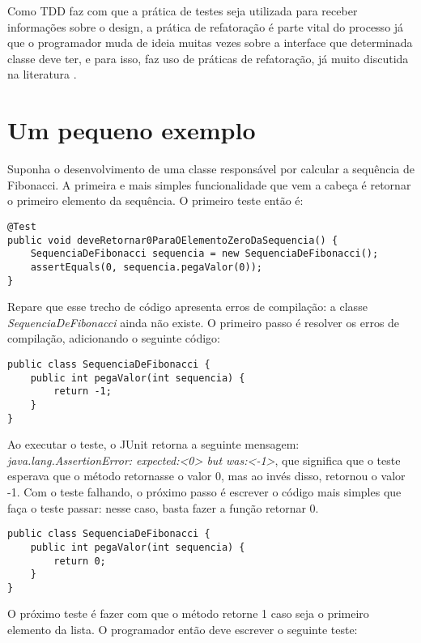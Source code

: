 Como TDD faz com que a prática de testes seja utilizada para receber informações sobre o design, 
a prática de refatoração é parte vital do processo já que o programador muda de ideia muitas vezes sobre a interface que determinada
classe deve ter, e para isso, faz uso de práticas de refatoração, já muito discutida na literatura \cite{fowler-refactoring} \cite{joshua-refactoring}.

\section{Um pequeno exemplo}
\label{sec:tdd-exemplo}

Suponha o desenvolvimento de uma classe responsável por calcular a sequência de Fibonacci. A primeira e mais simples funcionalidade que
vem a cabeça é retornar o primeiro elemento da sequência. O primeiro teste então é:

\begin{lstlisting}[frame=trbl]
@Test
public void deveRetornar0ParaOElementoZeroDaSequencia() {
	SequenciaDeFibonacci sequencia = new SequenciaDeFibonacci();
	assertEquals(0, sequencia.pegaValor(0));
}
\end{lstlisting}

Repare que esse trecho de código apresenta erros de compilação: a classe \textit{SequenciaDeFibonacci} ainda não existe. O primeiro
passo é resolver os erros de compilação, adicionando o seguinte código:

\begin{lstlisting}[frame=trbl]
public class SequenciaDeFibonacci {
	public int pegaValor(int sequencia) {
		return -1;
	}
}
\end{lstlisting}

Ao executar o teste, o JUnit retorna a seguinte mensagem: \textit{java.lang.AssertionError: expected:<0> but was:<-1>}, que significa que
o teste esperava que o método retornasse o valor 0, mas ao invés disso, retornou o valor -1. Com o teste falhando, o próximo passo é escrever
o código mais simples que faça o teste passar: nesse caso, basta fazer a função retornar 0.

\begin{lstlisting}[frame=trbl]
public class SequenciaDeFibonacci {
	public int pegaValor(int sequencia) {
		return 0;
	}
}
\end{lstlisting}

O próximo teste é fazer com que o método retorne 1 caso seja o primeiro elemento da lista. O programador então deve escrever o
seguinte teste:

